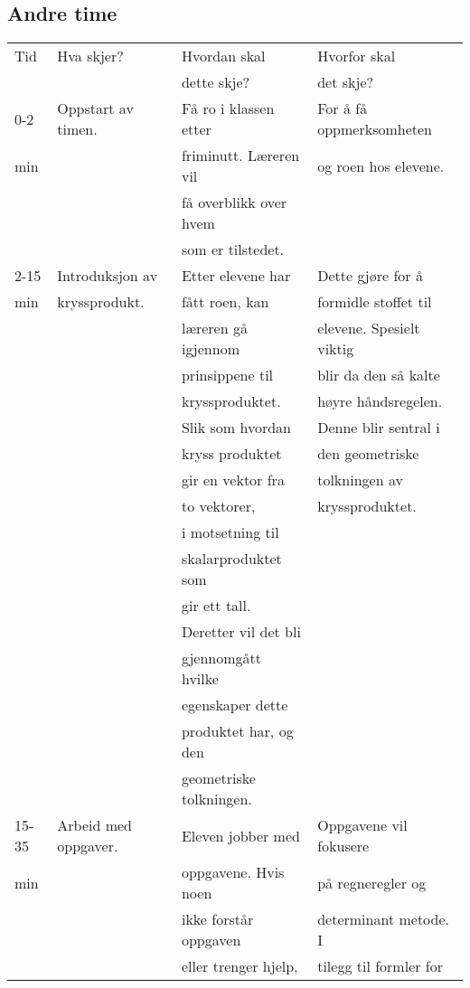 \documentclass{article}
\begin{document}
\subsection*{Andre time}
\label{sec-2-2}
\begin{center}
\begin{tabular}{l|l|l|l}
Tid & Hva skjer? & Hvordan skal & Hvorfor skal\\
 &  & dette skje? & det skje?\\
\hline
0-2 & Oppstart av timen. & Få ro i klassen etter & For å få oppmerksomheten\\
min &  & friminutt. Læreren vil & og roen hos elevene.\\
 &  & få overblikk over hvem & \\
 &  & som er tilstedet. & \\
\hline
2-15 & Introduksjon av & Etter elevene har & Dette gjøre for å\\
min & kryssprodukt. & fått roen, kan & formidle stoffet til\\
 &  & læreren gå igjennom & elevene. Spesielt viktig\\
 &  & prinsippene til & blir da den så kalte\\
 &  & kryssproduktet. & høyre håndsregelen.\\
 &  & Slik som hvordan & Denne blir sentral i\\
 &  & kryss produktet & den geometriske\\
 &  & gir en vektor fra & tolkningen av\\
 &  & to vektorer, & kryssproduktet.\\
 &  & i motsetning til & \\
 &  & skalarproduktet som & \\
 &  & gir ett tall. & \\
 &  & Deretter vil det bli & \\
 &  & gjennomgått hvilke & \\
 &  & egenskaper dette & \\
 &  & produktet har, og den & \\
 &  & geometriske tolkningen. & \\
\hline
15-35 & Arbeid med oppgaver. & Eleven jobber med & Oppgavene vil fokusere\\
min &  & oppgavene. Hvis noen & på regneregler og\\
 &  & ikke forstår oppgaven & determinant metode. I\\
 &  & eller trenger hjelp, & tilegg til formler for\\

\end{tabular}
\end{center}
\end{document}
